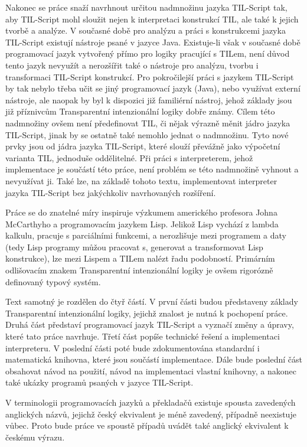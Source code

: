 Nakonec se práce snaží navrhnout určitou nadmnožinu jazyka TIL-Script tak, aby TIL-Script mohl
sloužit nejen k interpretaci konstrukcí TIL, ale také k jejich tvorbě a analýze. V současné době
pro analýzu a práci s konstrukcemi jazyka TIL-Script existují nástroje psané v jazyce Java.
Existuje-li však v současné době programovací jazyk vytvořený přímo pro logiky pracující s TILem,
není důvod tento jazyk nevyužít a nerozšířit také o nástroje pro analýzu, tvorbu i transformaci
TIL-Script konstrukcí. Pro pokročilejší práci s jazykem TIL-Script by tak nebylo třeba učit se jiný
programovací jazyk (Java), nebo využívat externí nástroje, ale naopak by byl k dispozici již
familiérní nástroj, jehož základy jsou již příznivcům Transparentní intenzionální logiky dobře
známy. Cílem této nadmnožiny ovšem není předefinovat TIL, či nějak výrazně měnit jádro jazyka
TIL-Script, jinak by se ostatně také nemohlo jednat o nadmnožinu. Tyto nové prvky jsou od jádra
jazyka TIL-Script, které slouží převážně jako výpočetní varianta TIL, jednoduše oddělitelné. Při
práci s interpreterem, jehož implementace je součástí této práce, není problém se této nadmnožině
vyhnout a nevyužívat ji. Také lze, na základě tohoto textu, implementovat interpreter jazyka
TIL-Script bez jakýchkoliv navrhovaných rozšíření.

Práce se do znatelné míry inspiruje výzkumem amerického profesora Johna McCarthyho a programovacím
jazykem Lisp. Jelikož Lisp vychází z lambda kalkulu, pracuje s parciálními funkcemi, a nerozlišuje
mezi programem a daty (tedy Lisp programy můžou pracovat s, generovat a transformovat Lisp
konstrukce), lze mezi Lispem a TILem nalézt řadu podobností. Primárním odlišovacím znakem
Transparentní intenzionální logiky je ovšem rigorózně definovaný typový systém.

Text samotný je rozdělen do čtyř částí. V první části budou představeny základy Transparentní
intenzionální logiky, jejichž znalost je nutná k pochopení práce. Druhá část představí programovací
jazyk TIL-Script a vyznačí změny a úpravy, které tato práce navrhuje. Třetí část popíše technické
řešení a implementaci interpreteru. V poslední části poté bude zdokumentována standardní i
matematická knihovna, které jsou součástí implementace. Dále bude poslední část obsahovat návod
na použití, návod na implementaci vlastní knihovny, a nakonec také ukázky programů psaných v jazyce
TIL-Script.

V terminologii programovacích jazyků a překladačů existuje spousta zavedených anglických názvů,
jejichž český ekvivalent je méně zavedený, případně neexistuje vůbec. Proto bude práce ve spoustě
případů uvádět také anglický ekvivalent k českému výrazu.

\endinput
